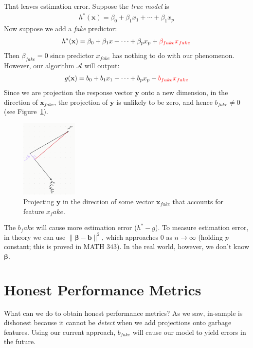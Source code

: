 \documentclass[12pt, a4paper]{article}
\theoremstyle{definition}
\begin{document}
	That leaves estimation error. Suppose the \textit{true model} is
	\begin{align*}
		h^*(\mathbf{x}) = \beta_0 + \beta_1 x_1 + \cdots + \beta_1 x_p
	\end{align*}
	Now suppose we add a \textit{fake} predictor:
	\begin{align*}
		h^*(\mathbf{x})
		= \beta_0 + \beta_1 x + \cdots + \beta_p x_p + {\color{red} \beta_{fake} x_{fake}}
	\end{align*}
	Then $\beta_{fake}=0$ since predictor $x_{fake}$ has nothing to do with
	our phenomenon. However, our algorithm $\mathcal{A}$ will output:
	\begin{align*}
		g(\mathbf{x}) = b_0 + b_1 x_1 + \cdots + b_p x_p + {\color{red}  b_{fake} x_{fake}}
	\end{align*}
	Since we are projection the response vector $\mathbf{y}$ onto a new dimension,
	in the direction of $\mathbf{x}_{fake}$, the projection of $\mathbf{y}$ is unlikely to
	be zero, and hence $b_{fake}\neq 0$ (see Figure~\ref{fig:project-xfake}).
	\begin{figure}
		\centering
		\includegraphics[width=0.25\textwidth]{project-onto-fake-feature}
		\caption{Projecting $\mathbf{y}$ in the direction of some vector $\mathbf{x}_{fake}$
		that accounts for feature $x_fake$.}
		\label{fig:project-xfake}
	\end{figure}
	The $b_fake$ will cause more estimation error ($h^*-g$). To measure estimation error,
	in theory we can use $\|\bm{\beta}-\mathbf{b}\|^2$, which approaches $0$ as
	$n\to\infty$ (holding $p$ constant; this is proved in MATH 343). In the real
	world, however, we don't know $\bm{\beta}$.
	\section*{Honest Performance Metrics}
	What can we do to obtain honest performance metrics? As we saw, in-sample is dishonest
	because it cannot be \textit{detect} when we add projections onto garbage features.
	Using our current approach, $b_{fake}$ will cause our model to yield errors in the future.
	
\end{document}
